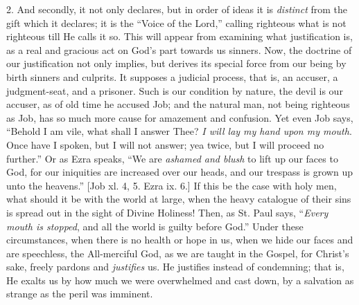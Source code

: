 2. And secondly, it not only declares, but in order of ideas it is \emph{distinct}
from the gift which it declares; it is the ``Voice of the
Lord,'' calling righteous what is not righteous till He calls it
so. This will appear from examining what justification is, as a real
and gracious act on God's part towards us sinners. Now, the doctrine
of our justification not only implies, but derives its special force
from our being by birth sinners and culprits. It supposes a judicial
process, that is, an accuser, a judgment-seat, and a prisoner. Such is
our condition by nature, the devil is our accuser, as of old time he
accused Job; and the natural man, not being righteous as Job, has so
much more cause for amazement and confusion. Yet even Job says,
``Behold I am vile, what shall I answer Thee? \emph{I will lay my
hand upon my mouth}. Once have I spoken, but I will not answer; yea
twice, but I will proceed no further.'' Or as Ezra speaks,
``We are \emph{ashamed and blush} to lift up our faces to God, for
our iniquities are increased over our heads, and our trespass is grown
up unto the heavens.'' [Job xl. 4, 5. Ezra ix. 6.] If this be the
case with holy men, what should it be with the world at large, when
the heavy catalogue of their sins is spread out in the sight of Divine
Holiness! Then, as St. Paul says, ``\emph{Every mouth is stopped},
and all the world is guilty before God.'' Under these
circumstances, when there is no health or hope in us, when we hide our
faces and are speechless, the All-merciful God, as we are taught in
the Gospel, for Christ's sake, freely pardons and \emph{justifies} us.
He justifies instead of condemning; that is, He exalts us by how much
we were overwhelmed and cast down, by a salvation as strange as the
peril was imminent.

